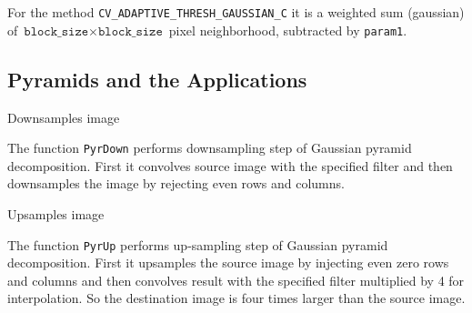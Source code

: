 For the method \texttt{CV\_ADAPTIVE\_THRESH\_GAUSSIAN\_C} it is a weighted sum (gaussian) of $\texttt{block\_size} \times \texttt{block\_size}$ pixel neighborhood, subtracted by \texttt{param1}.

\subsection{Pyramids and the Applications}

\label{PyrDown}

Downsamples image


\begin{description}
\end{description}

The function \texttt{PyrDown} performs downsampling step of Gaussian pyramid decomposition. First it convolves source image with the specified filter and then downsamples the image by rejecting even rows and columns.

\label{PyrUp}

Upsamples image


\begin{description}
\end{description}

The function \texttt{PyrUp} performs up-sampling step of Gaussian pyramid decomposition. First it upsamples the source image by injecting even zero rows and columns and then convolves result with the specified filter multiplied by 4 for interpolation. So the destination image is four times larger than the source image.

